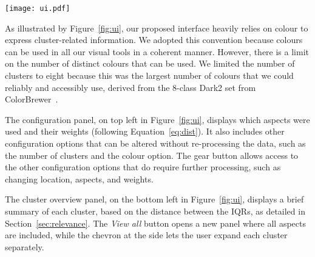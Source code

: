 \begin{figure*}
    \centering 
    \texttt{[image: ui.pdf]}
    \caption{Initial interface of our method showing the demographic evolution of Chicago. 
        \textbf{(a)}: Configuration panel with the current clustering parameters and controls.
        \textbf{(b)}: Cluster overview illustrating the most relevant aspect for each cluster. 
        \textbf{(c)}: Trajectories overview and the general evolution of the population, geographical information, and how it changed. 
        \textbf{(d)}: Details of the selected trajectories, including precise geographic locations, population numbers, and the composition of the aspects.\label{fig:ui}}
\end{figure*}


As illustrated by Figure~\ref{fig:ui}, our proposed interface heavily relies on
colour to express cluster-related information. We adopted this convention
because colours can be used in all our visual tools in a coherent manner.
However, there is a limit on the number of distinct colours that can be used. We
limited the number of clusters to eight because this was the largest number of
colours that we could reliably and accessibly use, derived from the 8-class
Dark2 set from ColorBrewer~\citep{ColorBrewer}. 


The configuration panel, on top left in Figure~\ref{fig:ui}, displays which
aspects were used and their weights (following Equation~\ref{eq:dist}). It also
includes other configuration options that can be altered without re-processing
the data, such as the number of clusters and the colour option. The gear button
allows access to the other configuration options that do require further
processing, such as changing location, aspects, and weights. 


The cluster overview panel, on the bottom left in Figure~\ref{fig:ui}, displays
a brief summary of each cluster, based on the distance between the IQRs, as
detailed in Section~\ref{sec:relevance}. The \emph{View all} button opens a new
panel where all aspects are included, while the chevron at the side lets the
user expand each cluster separately. 

